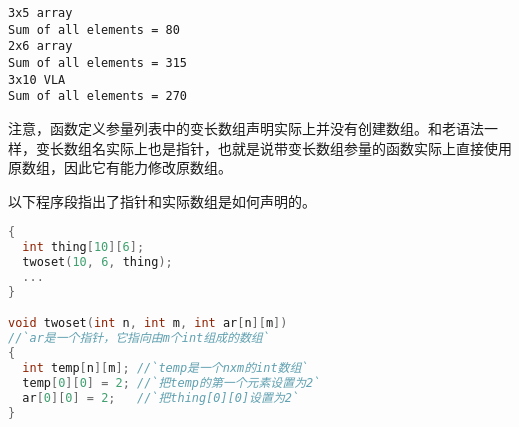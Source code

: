 \begin{frame}[fragile]\ft{\secname}
\begin{lstlisting}[backgroundcolor=\color{red!20}]
3x5 array
Sum of all elements = 80
2x6 array
Sum of all elements = 315
3x10 VLA
Sum of all elements = 270
\end{lstlisting}
\end{frame}

\begin{frame}[fragile]\ft{\secname}
注意，函数定义参量列表中的变长数组声明实际上并没有创建数组。和老语法一样，变长数组名实际上也是指针，也就是说带变长数组参量的函数实际上直接使用原数组，因此它有能力修改原数组。
\end{frame}

\begin{frame}[fragile]\ft{\secname}
以下程序段指出了指针和实际数组是如何声明的。
\begin{lstlisting}[language=c,backgroundcolor=\color{red!20}]
{
  int thing[10][6];
  twoset(10, 6, thing);
  ...
}

void twoset(int n, int m, int ar[n][m])
//`ar是一个指针，它指向由m个int组成的数组`
{
  int temp[n][m]; //`temp是一个nxm的int数组`
  temp[0][0] = 2; //`把temp的第一个元素设置为2`
  ar[0][0] = 2;   //`把thing[0][0]设置为2`
}
  
\end{lstlisting}

\end{frame}
